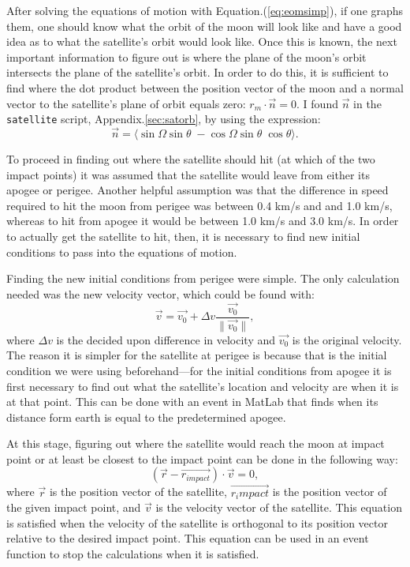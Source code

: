\documentclass{article}
\begin{document}
After solving the equations of motion with
Equation.(\ref{eq:eomsimp}), if one graphs
them, one should know what the orbit of the moon will look like and
have a good idea as to what the satellite's orbit would look
like. Once this is known, the next important information to figure out
is where the plane of the moon's orbit intersects the plane of the
satellite's orbit. In order to do this, it is sufficient to find where
the dot
product between the position vector of the moon and a normal vector to
the satellite's plane of orbit equals zero: $r_m \cdot \vec{n} = 0$.
I found $\vec{n}$ in the \verb[satellite[ script, Appendix.\ref{sec:satorb}, by using the
expression:
\begin{equation}
  \vec{n} = \langle \sin{\Omega}\sin{\theta} \;
  -\cos{\Omega}\sin{\theta} \; \cos{\theta} \rangle.
\end{equation}

To proceed in finding out where the satellite should hit (at which of
the two impact points) it was assumed that the satellite would leave
from either its apogee or perigee. Another helpful assumption was that
the difference in speed required to hit the moon from perigee was
between 0.4 km/s and and  1.0 km/s, whereas to hit from apogee it
would be between 1.0 km/s and 3.0 km/s. In order to actually get the
satellite to hit, then, it is necessary to find new initial conditions
to pass into the equations of motion.

Finding the new initial conditions from perigee were simple. The only
calculation needed was the new velocity vector, which could be found
with:
\begin{equation}
  \vec{v} = \vec{v_0} +\Delta v \frac{\vec{v_0}}{\|\vec{v_0}\|},
\end{equation}
where $\Delta v$ is the decided upon difference in velocity and
$\vec{v_0}$ is the original velocity. The reason it is simpler for the
satellite at perigee is because that is the initial condition we were
using beforehand---for the initial conditions from apogee it is first
necessary to find out what the satellite's location and velocity are
when it is at that point. This can be done with an event in MatLab
that finds when its distance form earth is equal to the predetermined
apogee.

At this stage, figuring out where the satellite would reach the moon
at impact point or at least be closest to the impact point can be done
in the following way:
\begin{equation}
  (\vec{r}-\vec{r_{impact}})\cdot \vec{v} = 0,
\end{equation}
where $\vec{r}$ is the position vector of the satellite,
$\vec{r_impact}$ is the position vector of the given impact point, and
$\vec{v}$ is the velocity vector of the satellite. This equation is
satisfied when the velocity of the satellite is orthogonal to its
position vector relative to the desired impact point. This equation
can be used in an event function to stop the calculations when it is satisfied.
\end{document}
